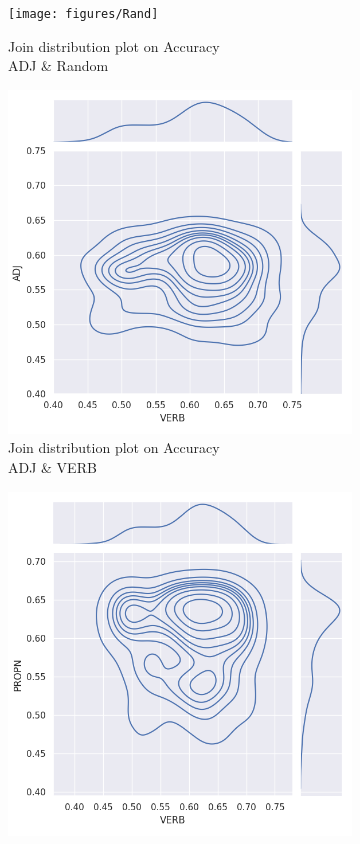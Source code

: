 \documentclass[12pt]{article}
\begin{document}
\begin{figure} [!h] 
\begin{subfigure}[h]{0.3\linewidth} 
\texttt{[image: figures/Rand]}
\caption{Join distribution plot on Accuracy\\ADJ \& Random}
\end{subfigure}
\hfill
\begin{subfigure}[h]{0.3\linewidth} 
\includegraphics[width=\linewidth]{figures/merge_adj_verb_joinplot.png}
\caption{Join distribution plot on Accuracy\\ADJ \& VERB}
\end{subfigure}
\hfill
\begin{subfigure}[h]{0.3\linewidth}
\includegraphics[width=\linewidth]{figures/merge_verb_propn_joinplot.png}

\end{subfigure}
\end{figure}
\end{document}
